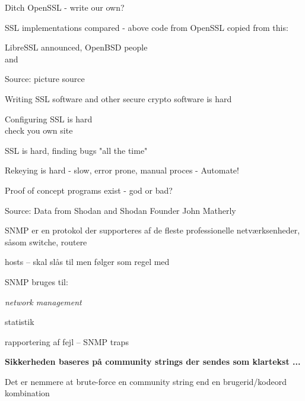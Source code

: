 \documentclass[20pt,landscape,a4paper,footrule]{foils}
\begin{document}
\begin{list1}
\item Ditch OpenSSL - write our own?
\item SSL implementations compared - above code from OpenSSL copied from this:\\
\item LibreSSL announced, OpenBSD people\\
  and 
\end{list1}


Source: picture source\\ {\footnotesize{}}
\begin{list2}
\item Writing SSL software and other secure crypto software is hard
\item Configuring SSL is hard\\
check you own site 
\item SSL is hard, finding bugs "all the time"
\item Rekeying is hard - slow, error prone, manual proces - Automate!
\item Proof of concept programs exist - god or bad?
\end{list2}



Source: Data from Shodan and Shodan Founder John Matherly


\begin{list1}
\item SNMP er en protokol der supporteres af de fleste professionelle
  netværksenheder, såsom switche, routere
\item hosts -- skal slås til men følger som regel med
\item SNMP bruges til:
  \begin{list2}
    \item \emph{network management}
    \item statistik
    \item rapportering af fejl -- SNMP traps
  \end{list2}
\item {\bfseries Sikkerheden baseres på community strings der sendes
    som klartekst ...}
\item Det er nemmere at brute-force en community string end en
  brugerid/kodeord kombination
\end{list1}
\end{document}
